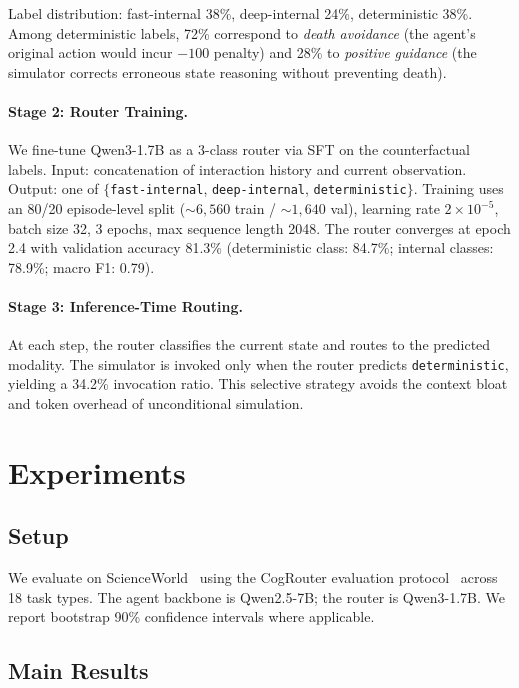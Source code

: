 \documentclass[11pt,a4paper]{article}
\begin{document}
Label distribution: fast-internal 38\%, deep-internal 24\%, deterministic 38\%.
Among deterministic labels, 72\% correspond to \emph{death avoidance} (the agent's original action would incur $-100$ penalty) and 28\% to \emph{positive guidance} (the simulator corrects erroneous state reasoning without preventing death).

\paragraph{Stage 2: Router Training.}
We fine-tune Qwen3-1.7B as a 3-class router via SFT on the counterfactual labels.
Input: concatenation of interaction history and current observation.
Output: one of $\{$\texttt{fast-internal}, \texttt{deep-internal}, \texttt{deterministic}$\}$.
Training uses an 80/20 episode-level split (${\sim}6{,}560$ train / ${\sim}1{,}640$ val), learning rate $2 \times 10^{-5}$, batch size 32, 3 epochs, max sequence length 2048.
The router converges at epoch 2.4 with validation accuracy 81.3\% (deterministic class: 84.7\%; internal classes: 78.9\%; macro F1: 0.79).

\paragraph{Stage 3: Inference-Time Routing.}
At each step, the router classifies the current state and routes to the predicted modality.
The simulator is invoked only when the router predicts \texttt{deterministic}, yielding a 34.2\% invocation ratio.
This selective strategy avoids the context bloat and token overhead of unconditional simulation.

\section{Experiments}

\subsection{Setup}
We evaluate on ScienceWorld~\cite{wang2022scienceworld} using the CogRouter evaluation protocol~\cite{qian2024cogrouter} across 18 task types.
The agent backbone is Qwen2.5-7B; the router is Qwen3-1.7B.
We report bootstrap 90\% confidence intervals where applicable.

\subsection{Main Results}
\end{document}
